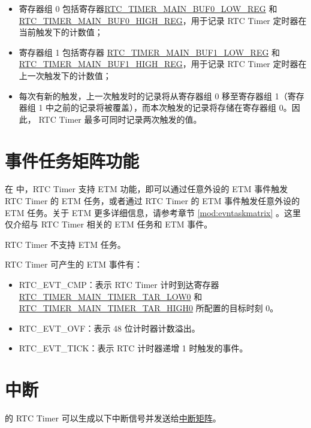 \documentclass[main\_\_CN.tex]{subfiles}
\begin{document}
\begin{itemize}
\begin{itemize}
        \item 寄存器组 0 包括寄存器\hyperref[regdesc:RTCTIMERMAINBUF0LOWREG]{RTC\_TIMER\_MAIN\_BUF0\_LOW\_REG} 和 \hyperref[regdesc:RTCTIMERMAINBUF0LOWREG]{RTC\_TIMER\_MAIN\_BUF0\_HIGH\_REG}，用于记录 RTC Timer 定时器在当前触发下的计数值；
        \item 寄存器组 1 包括寄存器 \hyperref[regdesc:RTCTIMERMAINBUF1LOWREG]{RTC\_TIMER\_MAIN\_BUF1\_LOW\_REG} 和 \hyperref[regdesc:RTCTIMERMAINBUF1HIGHREG]{RTC\_TIMER\_MAIN\_BUF1\_HIGH\_REG}，用于记录 RTC Timer 定时器在上一次触发下的计数值；
        \item 每次有新的触发，上一次触发时的记录将从寄存器组 0 移至寄存器组 1（寄存器组 1 中之前的记录将被覆盖），而本次触发的记录将存储在寄存器组 0。因此， RTC Timer 最多可同时记录两次触发的值。
    \end{itemize}
\end{itemize}




\section{事件任务矩阵功能}
\label{sec:rtctimer-etm-func}
在 \chipname{} 中，RTC Timer 支持 ETM 功能，即可以通过任意外设的 ETM 事件触发 RTC Timer 的 ETM 任务，或者通过 RTC Timer 的 ETM 事件触发任意外设的 ETM 任务。关于 ETM 更多详细信息，请参考章节 \ref{mod:evntaskmatrix} 。这里仅介绍与 RTC Timer 相关的 ETM 任务和 ETM 事件。

RTC Timer 不支持 ETM 任务。

RTC Timer 可产生的 ETM 事件有：

\begin{itemize}
    \item RTC\_EVT\_CMP：表示 RTC Timer 计时到达寄存器 \hyperref[regdesc:RTCTIMERTAR0LOWREG]{RTC\_TIMER\_MAIN\_TIMER\_TAR\_LOW0} 和 \hyperref[regdesc:RTCTIMERTAR0HIGHREG]{RTC\_TIMER\_MAIN\_TIMER\_TAR\_HIGH0} 所配置的目标时刻 0。
    \item RTC\_EVT\_OVF：表示 48 位计时器计数溢出。
    \item RTC\_EVT\_TICK：表示 RTC 计时器递增 1 时触发的事件。
\end{itemize}


\section{中断}
\chipname{} 的 RTC Timer 可以生成以下中断信号并发送给\hyperref[mod:intmtrx]{中断矩阵}。
\end{document}
